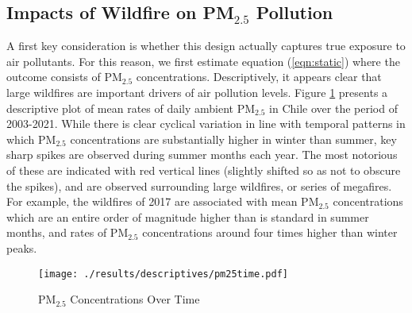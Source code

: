 \documentclass[11pt]{article}
\begin{document}
\begin{spacing}{1.5}
\subsection{Impacts of Wildfire on PM$_{2.5}$ Pollution}
\label{sscn:results_pm25}
A first key consideration is whether this design actually captures true exposure to air pollutants.  For this reason, we first estimate equation (\ref{eqn:static}) where the outcome consists of PM$_{2.5}$ concentrations. Descriptively, it appears clear that large wildfires are important drivers of air pollution levels.  Figure \ref{fig:PM25} presents a descriptive plot of mean rates of daily ambient PM$_{2.5}$ in Chile over the period of 2003-2021.  While there is clear cyclical variation in line with temporal patterns in which PM$_{2.5}$ concentrations are substantially higher in winter than summer, key sharp spikes are observed during summer months each year.  The most notorious of these are indicated with red vertical lines (slightly shifted so as not to obscure the spikes), and are observed surrounding large wildfires, or series of megafires.  For example, the wildfires of 2017 are associated with mean PM$_{2.5}$ concentrations which are an entire order of magnitude higher than is standard in summer months, and rates of PM$_{2.5}$ concentrations around four times higher than winter peaks.

\begin{figure}[ht!]
    \centering
    \texttt{[image: ./results/descriptives/pm25time.pdf]}
    \caption{PM$_{2.5}$ Concentrations Over Time}
    \label{fig:PM25}
\end{figure}





\end{spacing}
\end{document}
